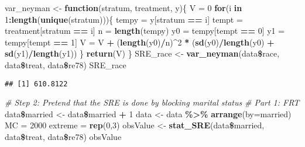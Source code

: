 \documentclass[]{article}
\newenvironment{Shaded}{\begin{snugshade}}{\end{snugshade}}
\newcommand{\KeywordTok}[1]{\textcolor[rgb]{0.13,0.29,0.53}{\textbf{#1}}}
\newcommand{\DataTypeTok}[1]{\textcolor[rgb]{0.13,0.29,0.53}{#1}}
\newcommand{\DecValTok}[1]{\textcolor[rgb]{0.00,0.00,0.81}{#1}}
\newcommand{\StringTok}[1]{\textcolor[rgb]{0.31,0.60,0.02}{#1}}
\newcommand{\CommentTok}[1]{\textcolor[rgb]{0.56,0.35,0.01}{\textit{#1}}}
\newcommand{\ControlFlowTok}[1]{\textcolor[rgb]{0.13,0.29,0.53}{\textbf{#1}}}
\newcommand{\OperatorTok}[1]{\textcolor[rgb]{0.81,0.36,0.00}{\textbf{#1}}}
\newcommand{\NormalTok}[1]{#1}
\begin{document}
\begin{Shaded}
\begin{Highlighting}[]
\NormalTok{var_neyman <-}\StringTok{ }\ControlFlowTok{function}\NormalTok{(stratum, treatment, y)\{}
\NormalTok{  V =}\StringTok{ }\DecValTok{0}
  \ControlFlowTok{for}\NormalTok{(i }\ControlFlowTok{in} \DecValTok{1}\OperatorTok{:}\KeywordTok{length}\NormalTok{(}\KeywordTok{unique}\NormalTok{(stratum)))\{}
\NormalTok{    tempy =}\StringTok{ }\NormalTok{y[stratum }\OperatorTok{==}\StringTok{ }\NormalTok{i]}
\NormalTok{    tempt =}\StringTok{ }\NormalTok{treatment[stratum }\OperatorTok{==}\StringTok{ }\NormalTok{i]}
\NormalTok{    n =}\StringTok{ }\KeywordTok{length}\NormalTok{(tempy)}
\NormalTok{    y0 =}\StringTok{ }\NormalTok{tempy[tempt }\OperatorTok{==}\StringTok{ }\DecValTok{0}\NormalTok{]}
\NormalTok{    y1 =}\StringTok{ }\NormalTok{tempy[tempt }\OperatorTok{==}\StringTok{ }\DecValTok{1}\NormalTok{]}
\NormalTok{    V =}\StringTok{ }\NormalTok{V }\OperatorTok{+}\StringTok{ }\NormalTok{(}\KeywordTok{length}\NormalTok{(y0)}\OperatorTok{/}\NormalTok{n)}\OperatorTok{^}\DecValTok{2} \OperatorTok{*}\StringTok{ }\NormalTok{(}\KeywordTok{sd}\NormalTok{(y0)}\OperatorTok{/}\KeywordTok{length}\NormalTok{(y0) }\OperatorTok{+}\StringTok{ }\KeywordTok{sd}\NormalTok{(y1)}\OperatorTok{/}\KeywordTok{length}\NormalTok{(y1))}
\NormalTok{  \}}
  \KeywordTok{return}\NormalTok{(V)}
\NormalTok{\}}
\NormalTok{SRE_race <-}\StringTok{ }\KeywordTok{var_neyman}\NormalTok{(data}\OperatorTok{\$}\NormalTok{race, data}\OperatorTok{\$}\NormalTok{treat, data}\OperatorTok{\$}\NormalTok{re78)}
\NormalTok{SRE_race}
\end{Highlighting}
\end{Shaded}

\begin{verbatim}
## [1] 610.8122
\end{verbatim}

\begin{Shaded}
\begin{Highlighting}[]
\CommentTok{# Step 2: Pretend that the SRE is done by blocking marital status}
\CommentTok{# Part 1: FRT}
\NormalTok{data}\OperatorTok{\$}\NormalTok{married <-}\StringTok{ }\NormalTok{data}\OperatorTok{\$}\NormalTok{married }\OperatorTok{+}\StringTok{ }\DecValTok{1}
\NormalTok{data <-}\StringTok{ }\NormalTok{data }\OperatorTok{\%>\%}\StringTok{ }\KeywordTok{arrange}\NormalTok{(}\DataTypeTok{by=}\NormalTok{married)}
\NormalTok{MC =}\StringTok{ }\DecValTok{2000}
\NormalTok{extreme =}\StringTok{ }\KeywordTok{rep}\NormalTok{(}\DecValTok{0}\NormalTok{,}\DecValTok{3}\NormalTok{)}
\NormalTok{obsValue <-}\StringTok{ }\KeywordTok{stat_SRE}\NormalTok{(data}\OperatorTok{\$}\NormalTok{married, data}\OperatorTok{\$}\NormalTok{treat, data}\OperatorTok{\$}\NormalTok{re78)}
\NormalTok{obsValue}
\end{Highlighting}
\end{Shaded}
\end{document}
